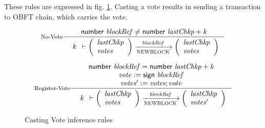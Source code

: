 These rules are expressed in fig. \ref{fig:casting-vote-rules}. Casting a vote results in sending a transaction to OBFT chain, which carries the vote.

\begin{figure}[htb]
  \begin{equation}\label{eq:no-vote}
    \inference[No-Vote]
    {
      \fun{number}~\var{blockRef} \neq \fun{number}~\var{lastChkp} + \var{k}\\
    }
    {
      \begin{array}{r}
        \var{k}
      \end{array}
      \vdash
      \left(
      \begin{array}{l}
        \var{lastChkp}\\
        \var{votes}\\
      \end{array}
      \right)
      \trans{NEWBLOCK}{\var{blockRef}}
      \left(
      \begin{array}{l}
        \var{lastChkp}\\
        \var{votes}\\
      \end{array}
      \right)
    }
  \end{equation}

  \nextdef

  \begin{equation}\label{eq:register-vote}
    \inference[Register-Vote]
    {
      \fun{number}~\var{blockRef} = \fun{number}~\var{lastChkp} + \var{k} \\
      \var{vote} \leteq \fun{sign}~\var{blockRef} \\
      \var{votes'} \leteq \var{votes};vote\\ 
    }
    {
      \begin{array}{r}
        \var{k}
      \end{array}
      \vdash
      \left(
      \begin{array}{l}
        \var{lastChkp}\\
        \var{votes}\\
      \end{array}
      \right)
      \trans{NEWBLOCK}{\var{blockRef}}
      \left(
      \begin{array}{l}
        \var{lastChkp}\\
        \var{votes'}\\
      \end{array}
      \right)
    }
  \end{equation}
  \caption{Casting Vote inference rules}
  \label{fig:casting-vote-rules}
\end{figure}



